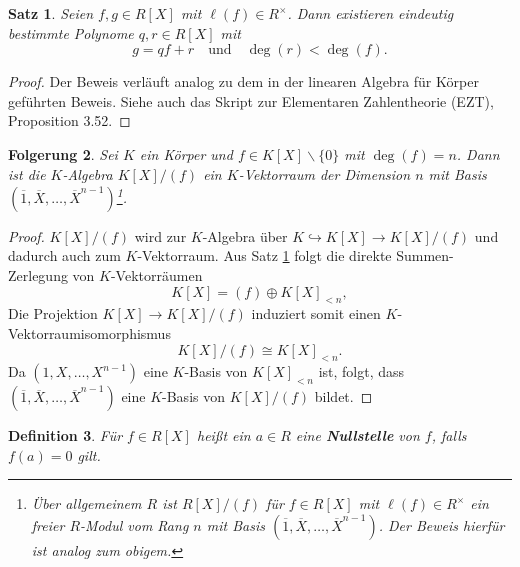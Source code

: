 \documentclass[a4paper, twoside, 11pt, ngerman]{report}
\renewcommand{\setminus}{\smallsetminus}
\theoremstyle{definistyle}
\newtheorem{satz}{Satz}[section]
\newtheorem{defini}[satz]{Definition}
\newtheorem{folgerung}[satz]{Folgerung}
\theoremstyle{remark}
\newcommand{\defn}[1]{\textit{\bfseries #1}}
\begin{document}
\begin{satz}\label{satz:polynomdivision}
Seien $f, g \in R[X]$ mit $\ell(f) \in R^\times$. Dann existieren eindeutig bestimmte Polynome $q, r \in R[X]$ mit
\[
g = q f + r \quad \text{und} \quad \deg(r) < \deg(f).
\]
\end{satz}

\begin{proof}
Der Beweis verläuft analog zu dem in der linearen Algebra für Körper geführten Beweis. Siehe auch das Skript zur Elementaren Zahlentheorie (EZT), Proposition 3.52.
\end{proof}

\begin{folgerung}\label{folgerung:polynomring-modul}
Sei $K$ ein Körper und $f \in K[X]\setminus\{0\}$ mit $\deg(f) = n$. Dann ist die $K$-Algebra $K[X]/(f)$ ein $K$-Vektorraum der Dimension $n$ mit Basis $(\overline{1}, \overline{X}, \dots, \overline{X}^{n-1})$\footnote{Über allgemeinem $R$ ist $R[X]/(f)$ für $f\in R[X]$
mit $\ell(f)\in R^\times$ ein freier $R$-Modul vom Rang $n$ mit Basis $(\overline{1}, \overline{X}, \dots, \overline{X}^{n-1})$. Der Beweis hierfür ist analog zum obigem.}.
\end{folgerung}

\begin{proof}
$K[X]/(f)$ wird zur $K$-Algebra über $K \hookrightarrow K[X] \to K[X]/(f)$ und dadurch auch zum $K$-Vektorraum. Aus Satz \ref{satz:polynomdivision} folgt die direkte Summen-Zerlegung von $K$-Vektorräumen
\[
K[X] = (f) \oplus K[X]_{<n},
\]
Die Projektion $K[X] \to K[X]/(f)$ induziert somit einen $K$-Vektorraumisomorphismus
\[
K[X]/(f) \cong K[X]_{<n}.
\]
Da $(1, X, \dots, X^{n-1})$ eine $K$-Basis von $K[X]_{<n}$ ist, folgt, dass $(\overline{1}, \overline{X}, \dots, \overline{X}^{n-1})$ eine $K$-Basis von $K[X]/(f)$ bildet.
\end{proof}

\begin{defini}\label{def:nullstelle}
Für $f \in R[X]$ heißt ein $a \in R$ eine \defn{Nullstelle} von $f$, falls $f(a) = 0$ gilt.
\end{defini}
\end{document}
